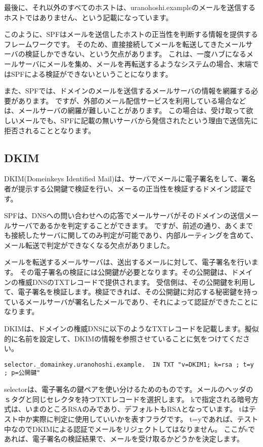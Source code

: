 最後に、それ以外のすべてのホストは、uranohoshi.exampleのメールを送信するホストではありません、という記載になっています。

このように、SPFはメールを送信したホストの正当性を判断する情報を提供するフレームワークです。
そのため、直接接続してメールを転送してきたメールサーバの検証しかできない、という欠点があります。
これは、一度ハブになるメールサーバにメールを集め、メールを再転送するようなシステムの場合、末端ではSPFによる検証ができないということになります。

また、SPFでは、ドメインのメールを送信するメールサーバの情報を網羅する必要があります。
ですが、外部のメール配信サービスを利用している場合などは、メールサーバの網羅が難しいことがあります。
この場合は、受け取って欲しいメールでも、SPFに記載の無いサーバから発信されたという理由で送信先に拒否されることとなります。


\subsection{DKIM}

DKIM(Domeinkeys Identified Mail)は、サーバでメールに電子署名をして、署名者が提示する公開鍵で検証を行い、メーるの正当性を検証するドメイン認証です。

SPFは、DNSへの問い合わせへの応答でメールサーバがそのドメインの送信メールサーバであるかを判定することができます。
ですが、前述の通り、あくまでも接続したサーバに関してのみ判定が可能であり、内部ルーティングを含めて、メール転送で判定ができなくなる欠点がありました。


メールを転送するメールサーバは、送出するメールに対して、電子署名を行います。 その電子署名の検証には公開鍵が必要となります。その公開鍵は、ドメインの権威DNSのTXTレコードで提供されます。 受信側は、その公開鍵を利用して、電子署名を検証します。検証できれば、その公開鍵に対応する秘密鍵を持っているメールサーバが署名したメールであり、それによって認証ができたことになります。

DKIMは、ドメインの権威DNSに以下のようなTXTレコードを記載します。擬似的に名前を設定して、DKIMの情報を参照させていることに気をつけてください。

\begin{verbatim}
selector._domainkey.uranohoshi.example.  IN TXT "v=DKIM1; k=rsa ; t=y ; p=公開鍵"
\end{verbatim}

selectorは、電子署名の鍵ペアを使い分けるためのものです。メールのヘッダのｓタグと同じセレクタを持つTXTレコードを選択します。
kで指定される暗号方式は、いまのところRSAのみであり、デフォルトもRSAとなっています。 
tはテスト中か実際に判定に使用していいかを表すフラグです。
t=yであれば、テスト中なのでDKIMによる認証でメールをリジェクトしてはなりません。
ここがsであれば、電子署名の検証結果で、メールを受け取るかどうかを決定します。

